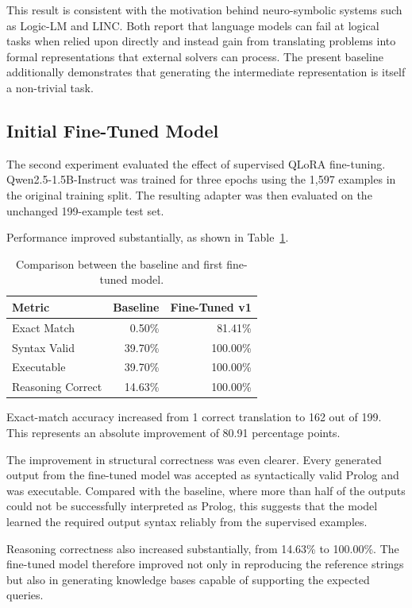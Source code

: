 \documentclass[11pt]{article} %
\theoremstyle{plain}
\theoremstyle{definition}
\begin{document}
This result is consistent with the motivation behind neuro-symbolic systems
such as Logic-LM and LINC. Both report that language models can fail at logical
tasks when relied upon directly and instead gain from translating problems into
formal representations that external solvers can process. The present baseline
additionally demonstrates that generating the intermediate representation is
itself a non-trivial task.


\subsection{Initial Fine-Tuned Model}

The second experiment evaluated the effect of supervised QLoRA fine-tuning.
Qwen2.5-1.5B-Instruct was trained for three epochs using the 1,597 examples in
the original training split. The resulting adapter was then evaluated on the
unchanged 199-example test set.

Performance improved substantially, as shown in
Table~\ref{tab:v1-results}.

\begin{table}[ht]
\centering
\caption{Comparison between the baseline and first fine-tuned model.}
\label{tab:v1-results}
\begin{tabular}{lrr}
\toprule
\textbf{Metric} & \textbf{Baseline} & \textbf{Fine-Tuned v1} \\
\midrule
Exact Match       & 0.50\%  & 81.41\%  \\
Syntax Valid      & 39.70\% & 100.00\% \\
Executable        & 39.70\% & 100.00\% \\
Reasoning Correct & 14.63\% & 100.00\%  \\
\bottomrule
\end{tabular}
\end{table}

Exact-match accuracy increased from 1 correct translation to 162 out of 199.
This represents an absolute improvement of 80.91 percentage points.

The improvement in structural correctness was even clearer. Every generated
output from the fine-tuned model was accepted as syntactically valid Prolog and
was executable. Compared with the baseline, where more than half of the outputs
could not be successfully interpreted as Prolog, this suggests that the model
learned the required output syntax reliably from the supervised examples.

Reasoning correctness also increased substantially, from 14.63\% to 100.00\%.
The fine-tuned model therefore improved not only in reproducing the reference
strings but also in generating knowledge bases capable of supporting the
expected queries.
\end{document}
